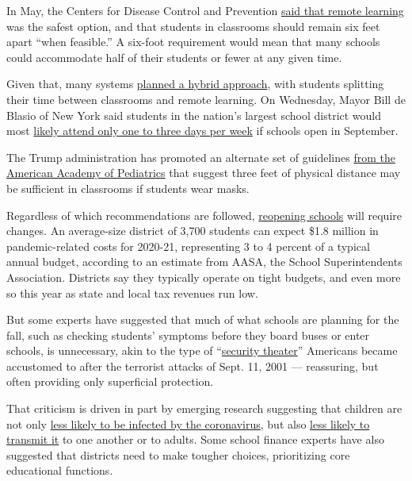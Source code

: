 In May, the Centers for Disease Control and Prevention
\href{https://www.cdc.gov/coronavirus/2019-ncov/community/schools-childcare/schools.html}{said
that remote learning} was the safest option, and that students in
classrooms should remain six feet apart ``when feasible.'' A six-foot
requirement would mean that many schools could accommodate half of their
students or fewer at any given time.

Given that, many systems
\href{https://www.nytimes3xbfgragh.onion/2020/06/26/us/coronavirus-schools-reopen-fall.html}{planned
a hybrid approach}, with students splitting their time between
classrooms and remote learning. On Wednesday, Mayor Bill de Blasio of
New York said students in the nation's largest school district would
most
\href{https://www.nytimes3xbfgragh.onion/2020/07/08/nyregion/nyc-schools-reopening-plan.html}{likely
attend only one to three days per week} if schools open in September.

The Trump administration has promoted an alternate set of guidelines
\href{https://www.nytimes3xbfgragh.onion/2020/06/30/us/coronavirus-schools-reopening-guidelines-aap.html}{from
the American Academy of Pediatrics} that suggest three feet of physical
distance may be sufficient in classrooms if students wear masks.

Regardless of which recommendations are followed,
\href{https://www.nytimes3xbfgragh.onion/2020/07/29/magazine/schools-reopening-covid.html}{reopening
schools} will require changes. An average-size district of 3,700
students can expect \$1.8 million in pandemic-related costs for 2020-21,
representing 3 to 4 percent of a typical annual budget, according to an
estimate from AASA, the School Superintendents Association. Districts
say they typically operate on tight budgets, and even more so this year
as state and local tax revenues run low.

But some experts have suggested that much of what schools are planning
for the fall, such as checking students' symptoms before they board
buses or enter schools, is unnecessary, akin to the type of
``\href{https://onezero.medium.com/the-public-is-being-misled-by-pandemic-technology-that-wont-keep-them-safe-1966ed740a87}{security
theater}'' Americans became accustomed to after the terrorist attacks of
Sept. 11, 2001 --- reassuring, but often providing only superficial
protection.

That criticism is driven in part by emerging research suggesting that
children are not only
\href{https://pubmed.ncbi.nlm.nih.gov/32546824/}{less likely to be
infected by the coronavirus}, but also
\href{https://pediatrics.aappublications.org/content/early/2020/05/22/peds.2020-004879}{less
likely to transmit it} to one another or to adults. Some school finance
experts have also suggested that districts need to make tougher choices,
prioritizing core educational functions.

